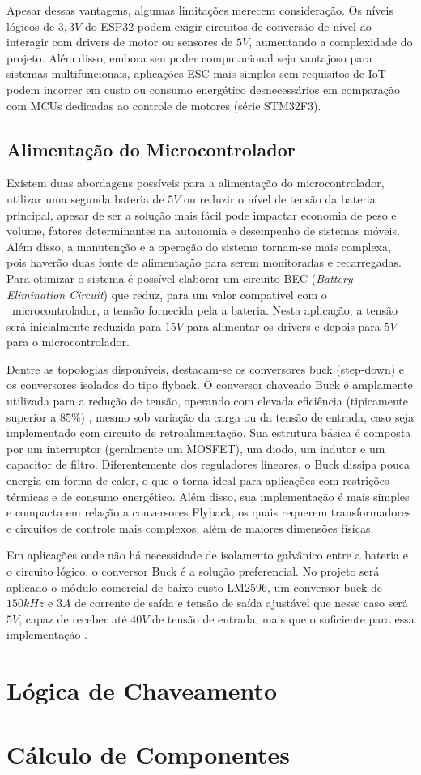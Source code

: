 \documentclass[12pt, a4paper, openright, oneside, brazilian]{abntex2}
\begin{document}
Apesar dessas vantagens, algumas limitações merecem consideração. Os níveis lógicos de $3,3V$ do ESP32 podem exigir circuitos de conversão de nível ao interagir com drivers de motor ou sensores de $5V$, aumentando a complexidade do projeto. Além disso, embora seu poder computacional seja vantajoso para sistemas multifuncionais, aplicações ESC mais simples sem requisitos de IoT podem incorrer em custo ou consumo energético desnecessários em comparação com MCUs dedicadas ao controle de motores (série STM32F3).

\subsection{Alimentação do Microcontrolador}
Existem duas abordagens possíveis para a alimentação do microcontrolador, utilizar uma segunda bateria de $5V$ ou reduzir o nível de tensão da bateria principal, apesar de ser a solução mais fácil pode impactar economia de peso e volume, fatores determinantes na autonomia e desempenho de sistemas móveis. Além disso, a manutenção e a operação do sistema tornam-se mais complexa, pois haverão duas fonte de alimentação para serem monitoradas e recarregadas. Para otimizar o sistema é possível elaborar um circuito BEC (\textit{Battery Elimination Circuit}) que reduz, para um valor compatível com o  microcontrolador, a tensão fornecida pela a bateria. Nesta aplicação, a tensão será inicialmente reduzida para $15V$ para alimentar os drivers e depois para $5V$ para o microcontrolador.

Dentre as topologias disponíveis, destacam-se os conversores buck (step-down) e os conversores isolados do tipo flyback. O conversor chaveado Buck é amplamente utilizada para a redução de tensão, operando com elevada eficiência (tipicamente superior a $85\%$) \cite{TIBuckCalculation}, mesmo sob variação da carga ou da tensão de entrada, caso seja implementado com circuito de retroalimentação. Sua estrutura básica é composta por um interruptor (geralmente um MOSFET), um diodo, um indutor e um capacitor de filtro. Diferentemente dos reguladores lineares, o Buck dissipa pouca energia em forma de calor, o que o torna ideal para aplicações com restrições térmicas e de consumo energético. Além disso, sua implementação é mais simples e compacta em relação a conversores Flyback, os quais requerem transformadores e circuitos de controle mais complexos, além de maiores dimensões físicas.

Em aplicações onde não há necessidade de isolamento galvânico entre a bateria e o circuito lógico, o conversor Buck é a solução preferencial. No projeto será aplicado o módulo comercial de baixo custo LM2596, um conversor buck de $150kHz$ e $3A$ de corrente de saída e tensão de saída ajustável que nesse caso será $5V$, capaz de receber até $40V$ de tensão de entrada, mais que o suficiente para essa implementação \cite{LM2596}.

\section{Lógica de Chaveamento}
\section{Cálculo de Componentes}

\postextual
\printbibliography
\end{document}
